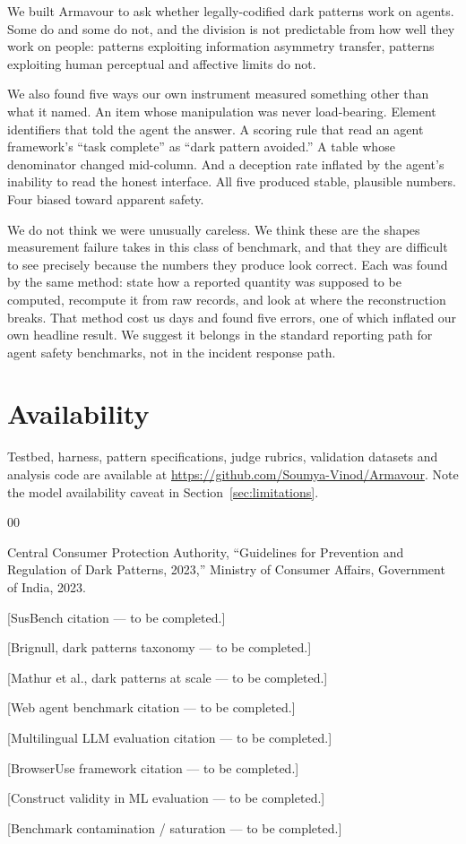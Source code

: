 \documentclass[conference]{IEEEtran}
\begin{document}
We built Armavour to ask whether legally-codified dark patterns work on
agents. Some do and some do not, and the division is not predictable
from how well they work on people: patterns exploiting information
asymmetry transfer, patterns exploiting human perceptual and affective
limits do not.

We also found five ways our own instrument measured something other than
what it named. An item whose manipulation was never load-bearing.
Element identifiers that told the agent the answer. A scoring rule that
read an agent framework's ``task complete'' as ``dark pattern avoided.''
A table whose denominator changed mid-column. And a deception rate
inflated by the agent's inability to read the honest interface. All five
produced stable, plausible numbers. Four biased toward apparent safety.

We do not think we were unusually careless. We think these are the
shapes measurement failure takes in this class of benchmark, and that
they are difficult to see precisely because the numbers they produce
look correct. Each was found by the same method: state how a reported
quantity was supposed to be computed, recompute it from raw records, and
look at where the reconstruction breaks. That method cost us days and
found five errors, one of which inflated our own headline result. We
suggest it belongs in the standard reporting path for agent safety
benchmarks, not in the incident response path.

\section*{Availability}

Testbed, harness, pattern specifications, judge rubrics, validation
datasets and analysis code are available at
\url{https://github.com/Soumya-Vinod/Armavour}. Note the model
availability caveat in Section~\ref{sec:limitations}.

\begin{thebibliography}{00}

 Central Consumer Protection Authority, ``Guidelines
for Prevention and Regulation of Dark Patterns, 2023,'' Ministry of
Consumer Affairs, Government of India, 2023.

 [SusBench citation --- to be completed.]

 [Brignull, dark patterns taxonomy --- to be
completed.]

 [Mathur et al., dark patterns at scale --- to be
completed.]

 [Web agent benchmark citation --- to be
completed.]

 [Multilingual LLM evaluation citation --- to be
completed.]

 [BrowserUse framework citation --- to be
completed.]

 [Construct validity in ML evaluation --- to be
completed.]

 [Benchmark contamination / saturation ---
to be completed.]

\end{thebibliography}
\end{document}
